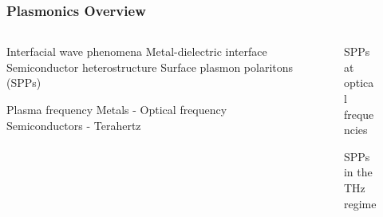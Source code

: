 \documentclass[10pt]{beamer}
\begin{document}
\begin{frame}
    \frametitle{Plasmonics Overview}
    \begin{columns} %
        \begin{column}{.5\textwidth}
            \begin{outline}[itemize]
                \1 Interfacial wave phenomena
                \2 Metal-dielectric interface
                \2 Semiconductor heterostructure
                \1 Surface plasmon polaritons (SPPs)
            \end{outline}
            \begin{outline}[itemize]
                \1 Plasma frequency
                \2 Metals - Optical frequency
                \2 Semiconductors - Terahertz
            \end{outline}
        \end{column}
        \begin{column}{.5\textwidth}
            \begin{figure}
                \centering
                \fontsize{6}{7}\selectfont%
                \def\svgwidth{.8\linewidth}
                
                \label{fig:spp}
                \caption{SPPs at optical frequencies}
            \end{figure}
            \begin{figure}
                \centering
                \fontsize{6}{7}\selectfont
                \def\svgwidth{.8\linewidth}
                
                \label{fig:spp_2deg}
                \caption{SPPs in the THz regime}
            \end{figure}
        \end{column}%
    \end{columns}
\end{frame}
\end{document}
